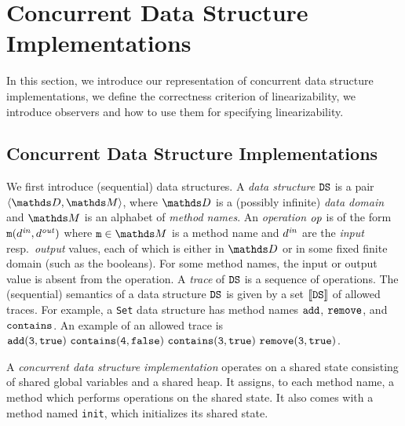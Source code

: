 \section{Concurrent Data Structure Implementations}
\label{programs:section}
In this section, we introduce our representation of
concurrent data structure implementations, we define the correctness criterion of
linearizability, we introduce observers and how to use them for specifying
linearizability.

\subsection{Concurrent Data Structure Implementations}

We first introduce (sequential) data structures.
A {\it data structure} ${\tt DS}$ is a pair
$\tuple{\ddomain,\malphabet}$,
where $\ddomain$ is a (possibly infinite) {\it data domain} and 
$\malphabet$ is an alphabet of {\em method names}.
%
%
An {\it operation} 
${\it op}$ is of the form
${\tt m}(d^{\it in},d^{\it out})$ where 
$\mname\in\malphabet$ is a method name and 
$d^{\it in}$ are the {\it input} resp.\ {\it output} values, each of which
is either in $\ddomain$ or in some fixed finite domain (such as the booleans).
%
For some method names, the input or output value is absent from the operation.
A {\it trace} of ${\tt DS}$ is a sequence of operations.
The (sequential) semantics of a data structure ${\tt DS}$ is given by
a set $\left\llbracket{{\tt DS}}\right\rrbracket$ of allowed traces.
For example, a {\tt Set} data structure has method names
$\tt add$, $\tt remove$, and $\tt contains$. An example of an allowed trace
is ${\tt add(3,true)\ contains(4,false)\ contains(3,true) \ remove(3,true)}$.
%


A {\em concurrent data structure implementation} operates on a shared
state consisting of shared global variables and a shared heap.
It assigns, to each method name,  a method which performs operations
%
on the shared state. It
also comes with a method named {\tt init}, which initializes its shared state.

